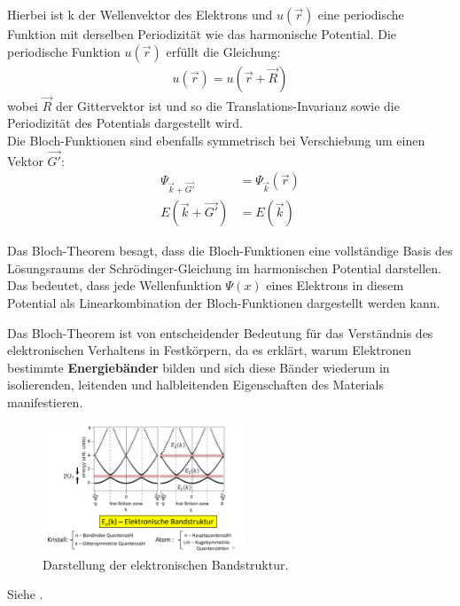 Hierbei ist k der Wellenvektor des Elektrons und $u(\vec{r})$ eine periodische Funktion mit derselben Periodizität wie das harmonische Potential. Die periodische Funktion $u(\vec{r})$ erfüllt die Gleichung:
\begin{align}
    u(\vec{r}) = u(\vec{r}+\vec{R})
\end{align}
wobei $\vec{R} $ der Gittervektor ist und so die Translations-Invarianz sowie die Periodizität des Potentials dargestellt wird. \\

Die Bloch-Funktionen sind ebenfalls symmetrisch bei Verschiebung um einen Vektor $\vec{G'}$:
\begin{align}
    \Psi _{\vec{k} + \vec{G'}} &= \Psi _{\vec{k}} (\vec{r}) \\
    E(\vec{k} + \vec{G'}) &= E(\vec{k})
\end{align}

Das Bloch-Theorem besagt, dass die Bloch-Funktionen eine vollständige Basis des Lösungsraums der Schrödinger-Gleichung im harmonischen Potential darstellen. Das bedeutet, dass jede Wellenfunktion $\Psi(x)$ eines Elektrons in diesem Potential als Linearkombination der Bloch-Funktionen dargestellt werden kann.

Das Bloch-Theorem ist von entscheidender Bedeutung für das Verständnis des elektronischen Verhaltens in Festkörpern, da es erklärt, warum Elektronen bestimmte \textbf{Energiebänder} bilden und sich diese Bänder wiederum in isolierenden, leitenden und halbleitenden Eigenschaften des Materials manifestieren.

\begin{figure}
    \centering
    \includegraphics[width=6cm]{resources/05-05-2015/frage8_blochtheorem.PNG}
    \caption{Darstellung der elektronischen Bandstruktur.}
\end{figure}

\label{q:9}

\label{q:10}

Siehe .


\newpage
